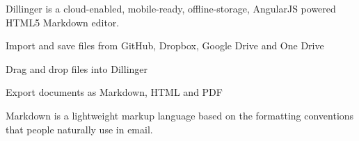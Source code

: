 Dillinger is a cloud-\/enabled, mobile-\/ready, offline-\/storage, Angular\-J\-S powered H\-T\-M\-L5 Markdown editor.


\begin{DoxyItemize}
\item Import and save files from Git\-Hub, Dropbox, Google Drive and One Drive
\item Drag and drop files into Dillinger
\item Export documents as Markdown, H\-T\-M\-L and P\-D\-F
\end{DoxyItemize}

Markdown is a lightweight markup language based on the formatting conventions that people naturally use in email. 